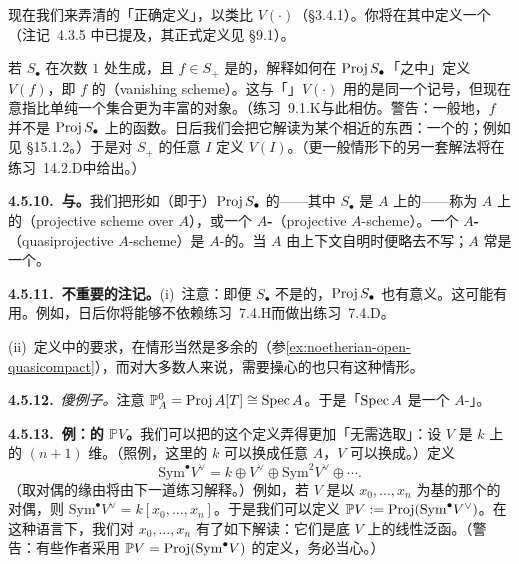 现在我们来弄清\trVanishingScheme{}的「正确定义」，以类比\trVanishingSet{} $V(\cdot)$（\S3.4.1）。你将在其中定义一个\trClosedSubscheme（注记~4.3.5 中已提及，其正式定义见 \S9.1）。

\begin{exercise}\label{ex:vanishing-scheme-definition}
若 $S_\bullet$ 在次数 $1$ 处生成，且 $f\in S_+$ 是\trHomogeneous{}的，解释如何在 $\operatorname{Proj} S_\bullet$「之中」定义 $V(f)$，即 $f$ 的\textbf{\trVanishingScheme}（vanishing scheme）。这与「\trVanishingSet」$V(\cdot)$ 用的是同一个记号，但现在意指比单纯一个集合更为丰富的对象。（\mbox{练习~9.1.K}与此相仿。警告：一般地，$f$ 并不是 $\operatorname{Proj} S_\bullet$ 上的函数。日后我们会把它解读为某个相近的东西：一个\trLineBundle{}的\trSection；例如见 \S15.1.2。）于是对 $S_+$ 的任意\trHomogeneous\trIdeal{} $I$ 定义 $V(I)$。（更一般情形下的另一套解法将在\mbox{练习~14.2.D}中给出。）
\end{exercise}

\textbf{4.5.10.\ \trProjectiveScheme{}与\trQuasiprojective\trScheme。}\quad 我们把形如（即\trIsomorphic{}于）$\operatorname{Proj} S_\bullet$ 的\trScheme——其中 $S_\bullet$ 是 $A$ 上的\trFinitelyGenerated\trGradedRing——称为 $A$ 上的\textbf{\trProjectiveScheme}（projective scheme over $A$），或一个\textbf{\trProjective{} $A$-\trScheme}（projective $A$-scheme）。一个\textbf{\trQuasiprojective{} $A$-\trScheme}（quasiprojective $A$-scheme）是\trProjective{} $A$-\trScheme{}的\trQuasicompact\trOpenSubscheme。当 $A$ 由上下文自明时便略去不写；$A$ 常是一个\trField。

\textbf{4.5.11.\ 不重要的注记。}\quad (i)~注意：即便 $S_\bullet$ 不是\trFinitelyGenerated{}的，$\operatorname{Proj} S_\bullet$ 也有意义。这可能有用。例如，日后你将能够不依赖\mbox{练习~7.4.H}而做出\mbox{练习~7.4.D}。

(ii)~\trQuasiprojectivity{}定义中的\trQuasicompact{}要求，在\trNoetherian{}情形当然是多余的（参\cref{ex:noetherian-open-quasicompact}），而对大多数人来说，需要操心的也只有这种情形。

\textbf{4.5.12.}\ \emph{傻例子。}\quad 注意 $\mathbb{P}^0_A=\operatorname{Proj} A[T]\cong\operatorname{Spec} A$。于是「$\operatorname{Spec} A$ 是一个\trProjective{} $A$-\trScheme」。

\textbf{4.5.13.\ 例：\trVectorSpace{}的\trProjectivization{} $\mathbb{P}V$。}\quad 我们可以把\trProjectiveSpace{}的这个定义弄得更加「无需选取」：设 $V$ 是 $k$ 上的 $(n+1)$ 维\trVectorSpace。（照例，这里的 $k$ 可以换成任意\trRing{} $A$，$V$ 可以换成\trFreeModule。）定义
\[
\mathrm{Sym}^{\bullet}V^{\vee}=k\oplus V^{\vee}\oplus\mathrm{Sym}^2V^{\vee}\oplus\cdots.
\]
（取对偶的缘由将由下一道练习解释。）例如，若 $V$ 是以 $x_0,\dots,x_n$ 为基的那个\trVectorSpace{}的对偶，则 $\mathrm{Sym}^{\bullet}V^{\vee}=k[x_0,\dots,x_n]$。于是我们可以定义 $\mathbb{P}V:=\operatorname{Proj}(\mathrm{Sym}^{\bullet}V^{\vee})$。在这种语言下，我们对 $x_0,\dots,x_n$ 有了如下解读：它们是底\trVectorSpace{} $V$ 上的线性泛函。（警告：有些作者采用 $\mathbb{P}V=\operatorname{Proj}(\mathrm{Sym}^{\bullet}V)$ 的定义，务必当心。）

